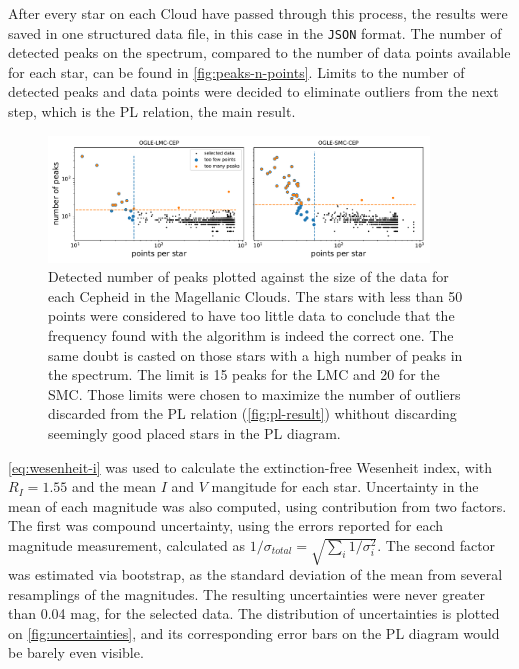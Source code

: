 After every star on each Cloud have passed through this process, the results were saved in one structured data file, in this case in the \texttt{JSON} format.
The number of detected peaks on the spectrum, compared to the number of data points available for each star, can be found in \autoref{fig:peaks-n-points}.
Limits to the number of detected peaks and data points were decided to eliminate outliers from the next step, which is the PL relation, the main result.

\begin{figure}
	\centering
	\includegraphics[width=0.9\textwidth]{img/peaks_vs_points.pdf}
	\caption[Results: detected number of peaks against data size]{
		Detected number of peaks plotted against the size of the data for each Cepheid in the Magellanic Clouds.
		The stars with less than 50 points were considered to have too little data to conclude that the frequency found with the algorithm is indeed the correct one.
		The same doubt is casted on those stars with a high number of peaks in the spectrum. The limit is 15 peaks for the LMC and 20 for the SMC.
		Those limits were chosen to maximize the number of outliers discarded from the PL relation (\autoref{fig:pl-result}) whithout discarding seemingly good placed stars in the PL diagram.
	}
	\label{fig:peaks-n-points}
\end{figure}


\autoref{eq:wesenheit-i} was used to calculate the extinction-free Wesenheit index, 
with $R_I=1.55$ \citep{OGLE2015,Ulaczyk2013} and the mean $I$ and $V$ mangitude for each star.
Uncertainty in the mean of each magnitude was also computed, using contribution from two factors.
The first was compound uncertainty, using the errors reported for each magnitude measurement, calculated as $1/\sigma_{total}=\sqrt{\sum_i 1/\sigma_i^2}$.
The second factor was estimated via bootstrap, as the standard deviation of the mean from several resamplings of the magnitudes.
The resulting uncertainties were never greater than 0.04 mag, for the selected data. 
The distribution of uncertainties is plotted on \autoref{fig:uncertainties}, 
and its corresponding error bars on the PL diagram would be barely even visible.

